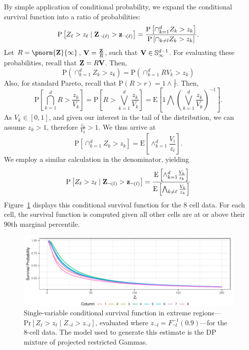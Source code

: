 By simple application of conditional probability, we expand the conditional survival function into
  a ratio of probabilities:
  \begin{equation}
    \label{eqn:condsurv1d}
    \text{P}\left[Z_{\ell} > z_{\ell}\mid {\bf Z}_{\neg(\ell)} > {\bf z}_{\neg(\ell)}\right] =
      \frac{\text{P}\left[\cap_{k = 1}^d Z_k > z_k\right]}{\text{P}\left[\cap_{k \neq l} Z_k > z_k\right]}.
  \end{equation}
  Let $R = \pnorm{{\bf Z}}{\infty}$, ${\bf V} = \frac{{\bf Z}}{R}$, such that ${\bf V}\in {\mathbb S}_{\infty}^{d-1}$.
  For evaluating these probabilities, recall that ${\bf Z} = R{\bf V}$.  Then,
  \begin{equation}
    \text{P}\left(\cap_{k = 1}^d Z_k > z_k\right) = \text{P}\left(\cap_{k = 1}^d RV_k > z_k\right)
  \end{equation}
  Also, for standard Pareto, recall that $\text{P}(R > r) = 1\wedge\frac{1}{r}$.  Then,
  \begin{equation}
    \text{P}\left[\bigcap_{k = 1}^d R > \frac{z_k}{V_k}\right] =
      \text{P}\left[R  > \bigvee_{k=1}^d\frac{z_k}{V_k}\right] =
      \text{E}\left[1 \bigwedge \left(\bigvee_{k = 1}^d\frac{z_k}{V_k}\right)^{-1}\right].
  \end{equation}
  As $V_k \in [0,1]$, and given our interest in the tail of the distribution, we can assume
  $z_k > 1$, therefore $\frac{z_k}{V_k} > 1$.  We thus arrive at
  \begin{equation}
    \text{P}\left[\cap_{k = 1}^d Z_k > z_k\right] = \text{E}\left[\wedge_{k = 1}^d\frac{V_i}{z_i}\right].
  \end{equation}
  We employ a similar calculation in the denominator, yielding
  \begin{equation}
    \text{P}\left[Z_{\ell} > z_{\ell}\mid {\bf Z}_{\neg(l)} > {\bf z}_{\neg(l)}\right] =
      \frac{\text{E}\left[\wedge_{k = 1}^d \frac{V_k}{z_k}\right]}{\text{E}\left[\bigwedge_{k \neq \ell}\frac{V_k}{z_k}\right]}
  \end{equation}
  Figure~\ref{fig:condsurv1d} displays this conditional survival function for the 8 cell data. For each
  cell, the survival function is computed given all other cells are at or above their $90$th marginal
  percentile.

\begin{figure}[b]
  \caption{
    Single-variable conditional survival function in extreme
    regions---$\text{Pr}[Z_{\ell} > z_{\ell}\mid Z_{\neg l} > z_{\neg l}]$,
    evaluated where $z_{\neg l} = F_{\neg l}^{-1}(0.9)$---for the 8-cell data.  The model used to
    generate this estimate is the DP mixture of projected restricted Gammas.\label{fig:condsurv1d}
    }
  \centering
  \includegraphics[width = 5in]{./images/condsurv_1d}
\end{figure}

